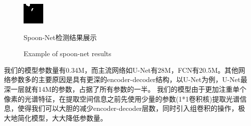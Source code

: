 \documentclass[10pt]{ctexart}
\begin{document}
\begin{multicols}{2}
\begin{figure}[H]
{\begin{minipage}[b]{0.15\linewidth}
            \includegraphics[width=1\linewidth]{../log/spoon2/cut/tmp_cut_LC80980712014024LGN00_15443_unet.jpg}\vspace{4pt}
        \end{minipage}
    }
\caption{Spoon-Net检测结果展示}
\addtocounter{figure}{-1}
\vspace{-5pt}
\renewcommand{\figurename}{Fig}
\caption{Example of spoon-net results}
\renewcommand{\figurename}{图}
\label{Fig.main1}
\end{figure}

我们的模型参数量有0.34M，而主流网络如U-Net有28M，FCN有20.5M。其他网络参数多的主要原因是具有更深的encoder-decoder结构，以U-Net为例，U-Net最深一层就有14M的参数，占据了所有参数的一半。
我们的模型由于更加注重单个像素的光谱特征，在提取空间信息之前先使用少量的参数(1*1卷积核)提取光谱信息，使得我们可以大胆的减少encoder-decoder层数，同时引入组卷积的操作，极大地简化模型，大大降低参数量。


\end{multicols}
\end{document}
